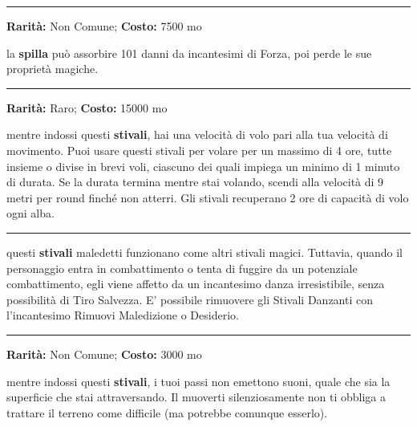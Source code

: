 \begin{multicols}{2}
\smallskip\noindent\rule{\linewidth}{2pt}  \hypertarget{SpilladellaDifesa}{}\smallskip{}\noindent\label{SpilladellaDifesa}

\textbf{Rarità:} Non Comune; \textbf{Costo:} 7500 mo

la \textbf{spilla} può assorbire 101 danni da incantesimi di Forza, poi perde le sue proprietà magiche.

\smallskip\noindent\rule{\linewidth}{2pt}  \hypertarget{StivaliAlati}{}\smallskip{}\noindent\label{StivaliAlati}

\textbf{Rarità:} Raro; \textbf{Costo:} 15000 mo

mentre indossi questi \textbf{stivali}, hai una velocità di volo pari alla tua velocità di movimento. Puoi usare questi stivali per volare per un massimo di 4 ore, tutte insieme o divise in brevi voli, ciascuno dei quali impiega un minimo di 1 minuto di durata. Se la durata termina mentre stai volando, scendi alla velocità di 9 metri per round finché non atterri. Gli stivali recuperano 2 ore di capacità di volo ogni alba.

\smallskip\noindent\rule{\linewidth}{2pt}  \hypertarget{StivaliDanzanti}{}\smallskip{}\noindent\label{StivaliDanzanti}

questi \textbf{stivali} maledetti funzionano come altri stivali magici. Tuttavia, quando il personaggio entra in combattimento o tenta di fuggire da un potenziale combattimento, egli viene affetto da un incantesimo danza irresistibile, senza possibilità di Tiro Salvezza. E' possibile rimuovere gli Stivali Danzanti con l'incantesimo Rimuovi Maledizione o Desiderio.

\smallskip\noindent\rule{\linewidth}{2pt}  \hypertarget{StivalidegliElfi}{}\smallskip{}\noindent\label{StivalidegliElfi}

\textbf{Rarità:} Non Comune; \textbf{Costo:} 3000 mo

mentre indossi questi \textbf{stivali}, i tuoi passi non emettono suoni, quale che sia la superficie che stai attraversando. Il muoverti silenziosamente non ti obbliga a trattare il terreno come difficile (ma potrebbe comunque esserlo).


\end{multicols}

